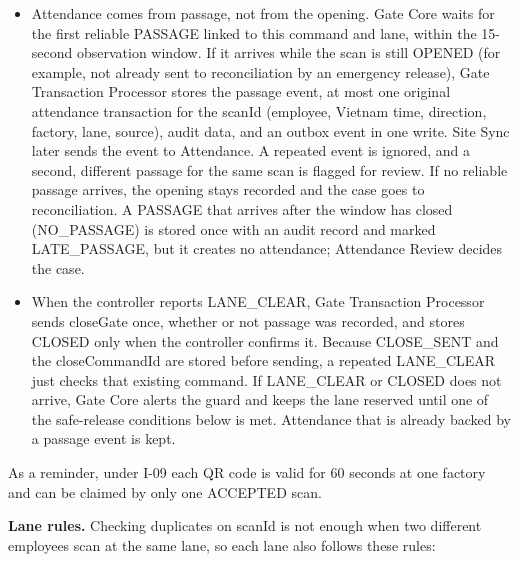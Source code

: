 \begin{itemize}[leftmargin=30pt, labelwidth=24pt, labelsep=6pt, align=left, itemsep=3pt, topsep=4pt, parsep=2pt]
  \item[\textbf{A8}] Attendance comes from passage, not from the opening. Gate Core waits for the first reliable PASSAGE linked to this command and lane, within the 15-second observation window. If it arrives while the scan is still OPENED (for example, not already sent to reconciliation by an emergency release), Gate Transaction Processor stores the passage event, at most one original attendance transaction for the scanId (employee, Vietnam time, direction, factory, lane, source), audit data, and an outbox event in one write. Site Sync later sends the event to Attendance. A repeated event is ignored, and a second, different passage for the same scan is flagged for review. If no reliable passage arrives, the opening stays recorded and the case goes to reconciliation. A PASSAGE that arrives after the window has closed (NO\_PASSAGE) is stored once with an audit record and marked LATE\_PASSAGE, but it creates no attendance; Attendance Review decides the case.
  \item[\textbf{A9}] When the controller reports LANE\_CLEAR, Gate Transaction Processor sends closeGate once, whether or not passage was recorded, and stores CLOSED only when the controller confirms it. Because CLOSE\_SENT and the closeCommandId are stored before sending, a repeated LANE\_CLEAR just checks that existing command. If LANE\_CLEAR or CLOSED does not arrive, Gate Core alerts the guard and keeps the lane reserved until one of the safe-release conditions below is met. Attendance that is already backed by a passage event is kept.
\end{itemize}

As a reminder, under I-09 each QR code is valid for 60 seconds at one factory and can be claimed by only one ACCEPTED scan.

\textbf{Lane rules.} Checking duplicates on scanId is not enough when two different employees scan at the same lane, so each lane also follows these rules:

